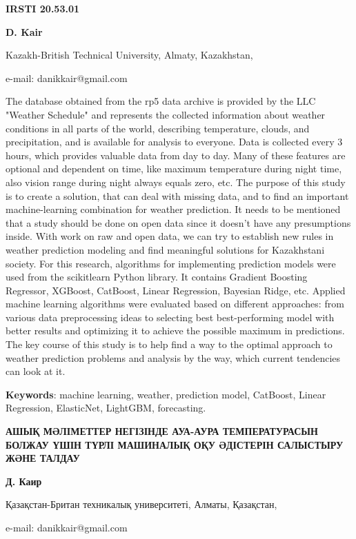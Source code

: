 \newpage
{\bfseries IRSTI 20.53.01}


\begin{center}
{\bfseries D. Kair}

Kazakh-British Technical University, Almaty, Kazakhstan,

e-mail: danikkair@gmail.com
\end{center}

The database obtained from the rp5 data archive is provided by the LLC
"Weather Schedule" and represents the collected information about
weather conditions in all parts of the world, describing temperature,
clouds, and precipitation, and is available for analysis to everyone.
Data is collected every 3 hours, which provides valuable data from day
to day. Many of these features are optional and dependent on time, like
maximum temperature during night time, also vision range during night
always equals zero, etc. The purpose of this study is to create a
solution, that can deal with missing data, and to find an important
machine-learning combination for weather prediction. It needs to be
mentioned that a study should be done on open data since it doesn't have
any presumptions inside. With work on raw and open data, we can try to
establish new rules in weather prediction modeling and find meaningful
solutions for Kazakhstani society. For this research, algorithms for
implementing prediction models were used from the scikitlearn Python
library. It contains Gradient Boosting Regressor, XGBoost, CatBoost,
Linear Regression, Bayesian Ridge, etc. Applied machine learning
algorithms were evaluated based on different approaches: from various
data preprocessing ideas to selecting best best-performing model with
better results and optimizing it to achieve the possible maximum in
predictions. The key course of this study is to help find a way to the
optimal approach to weather prediction problems and analysis by the way,
which current tendencies can look at it.

{\bfseries Keywords}: machine learning, weather, prediction model,
CatBoost, Linear Regression, ElasticNet, LightGBM, forecasting.

\begin{center}
{\large\bfseries АШЫҚ МӘЛІМЕТТЕР НЕГІЗІНДЕ АУА-АУРА ТЕМПЕРАТУРАСЫН БОЛЖАУ ҮШІН
ТҮРЛІ МАШИНАЛЫҚ ОҚУ ӘДІСТЕРІН САЛЫСТЫРУ ЖӘНЕ ТАЛДАУ}

{\bfseries Д. Каир}

Қазақстан-Британ техникалық университеті, Алматы, Қазақстан,

e-mail: danikkair@gmail.com
\end{center}

